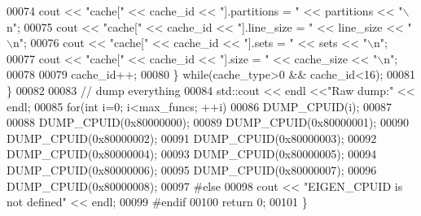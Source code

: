 \begin{DoxyCode}
00074       cout << \textcolor{stringliteral}{"cache["} << cache\_id << \textcolor{stringliteral}{"].partitions = "} << partitions << \textcolor{stringliteral}{"\(\backslash\)n"};
00075       cout << \textcolor{stringliteral}{"cache["} << cache\_id << \textcolor{stringliteral}{"].line\_size  = "} << line\_size << \textcolor{stringliteral}{"\(\backslash\)n"};
00076       cout << \textcolor{stringliteral}{"cache["} << cache\_id << \textcolor{stringliteral}{"].sets       = "} << sets << \textcolor{stringliteral}{"\(\backslash\)n"};
00077       cout << \textcolor{stringliteral}{"cache["} << cache\_id << \textcolor{stringliteral}{"].size       = "} << cache\_size << \textcolor{stringliteral}{"\(\backslash\)n"};
00078       
00079       cache\_id++;
00080     \} \textcolor{keywordflow}{while}(cache\_type>0 && cache\_id<16);
00081   \}
00082   
00083   \textcolor{comment}{// dump everything}
00084   std::cout << endl <<\textcolor{stringliteral}{"Raw dump:"} << endl;
00085   \textcolor{keywordflow}{for}(\textcolor{keywordtype}{int} i=0; i<max\_funcs; ++i)
00086     DUMP\_CPUID(i);
00087 
00088   DUMP\_CPUID(0x80000000);
00089   DUMP\_CPUID(0x80000001);
00090   DUMP\_CPUID(0x80000002);
00091   DUMP\_CPUID(0x80000003);
00092   DUMP\_CPUID(0x80000004);
00093   DUMP\_CPUID(0x80000005);
00094   DUMP\_CPUID(0x80000006);
00095   DUMP\_CPUID(0x80000007);
00096   DUMP\_CPUID(0x80000008);
00097 \textcolor{preprocessor}{  #else}
00098   cout << \textcolor{stringliteral}{"EIGEN\_CPUID is not defined"} << endl;
00099 \textcolor{preprocessor}{  #endif}
00100   \textcolor{keywordflow}{return} 0;
00101 \}
\end{DoxyCode}
